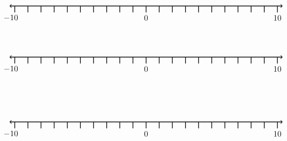 \documentclass[leqno, 12pt]{article}
\begin{document}
\vspace{10pt}\begin{equation}
    \begin{tikzpicture}[scale=0.67, baseline={([yshift=-1pt]current bounding box.north)}]
        \draw[{To[scale=1.3]}-{To[scale=1.3]}, line width=1pt] (-10.4, 0) -- (10.4, 0);
        \foreach \x in {-10,-9,...,10}
            \draw[shift={(\x,0)},color=black, line width=1pt] (0pt,-14pt) -- (0pt,0pt);
        \foreach \x in {-10}
            \draw[shift={(\x -0.3,-0.8)},color=black] node[font=\large,text height=12pt] {$\x$};
        \foreach \x in {0,10}
            \draw[shift={(\x,-0.8)},color=black] node[font=\large,text height=12pt] {$\x$};
        \node [font=\large, anchor=east] at (15,1.65){$  $};
    \end{tikzpicture}
\end{equation}
\vspace{10pt}\begin{equation}
    \begin{tikzpicture}[scale=0.67, baseline={([yshift=-1pt]current bounding box.north)}]
        \draw[{To[scale=1.3]}-{To[scale=1.3]}, line width=1pt] (-10.4, 0) -- (10.4, 0);
        \foreach \x in {-10,-9,...,10}
            \draw[shift={(\x,0)},color=black, line width=1pt] (0pt,-14pt) -- (0pt,0pt);
        \foreach \x in {-10}
            \draw[shift={(\x -0.3,-0.8)},color=black] node[font=\large,text height=12pt] {$\x$};
        \foreach \x in {0,10}
            \draw[shift={(\x,-0.8)},color=black] node[font=\large,text height=12pt] {$\x$};
        \node [font=\large, anchor=east] at (15,1.65){$  $};
    \end{tikzpicture}
\end{equation}
\vspace{10pt}\pagebreak ~ \newline ~ \newline\begin{equation}
    \begin{tikzpicture}[scale=0.67, baseline={([yshift=-1pt]current bounding box.north)}]
        \draw[{To[scale=1.3]}-{To[scale=1.3]}, line width=1pt] (-10.4, 0) -- (10.4, 0);
        \foreach \x in {-10,-9,...,10}
            \draw[shift={(\x,0)},color=black, line width=1pt] (0pt,-14pt) -- (0pt,0pt);
        \foreach \x in {-10}
            \draw[shift={(\x -0.3,-0.8)},color=black] node[font=\large,text height=12pt] {$\x$};
        \foreach \x in {0,10}
            \draw[shift={(\x,-0.8)},color=black] node[font=\large,text height=12pt] {$\x$};
        \node [font=\large, anchor=east] at (15,1.65){$  $};
    \end{tikzpicture}
\end{equation}
\end{document}
